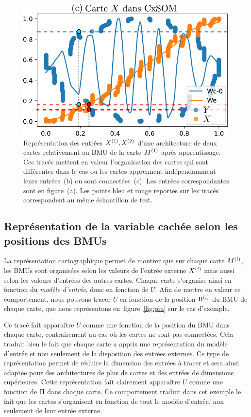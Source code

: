\documentclass[../main]{subfiles}
\begin{document}
\begin{figure}
\begin{minipage}{0.38\textwidth}
\includegraphics[width=\textwidth]{weights_2som.pdf}
\end{minipage}

\caption{Représentation des entrées $X^{({1})},X^{({2})}$ d'une architecture de deux cartes relativement au BMU de la carte $M^{({1})}$ après apprentissage. Ces tracés mettent en valeur l'organisation des cartes qui sont différentes dans le cas ou les cartes apprennent indépendamment leurs entrées~(b) ou sont connectées~(c). Les entrées correspondantes sont en figure~(a). Les points bleu et rouge reportés sur les tracés correspondent au même échantillon de test.\label{fig:inputs}}
\end{figure}

\subsection{Représentation de la variable cachée selon les positions des BMUs}

La représentation cartographique permet de montrer que sur chaque carte $M^{({i})}$, les BMUs sont organisées selon les valeurs de l'entrée externe $X^{({i})}$ mais aussi selon les valeurs d'entrées des autres cartes. Chaque carte s'organise ainsi en fonction du \emph{modèle d'entrée}, donc en fonction de $U$.
Afin de mettre en valeur ce comportement, nous pouvons tracer $U$ en fonction de la position $\Pi^{({i})}$ du BMU de chaque carte, que nous représentons en~figure~\ref{fig:piu} sur le cas d'exemple.

Ce tracé fait apparaître $U$ comme une fonction de la position du BMU dans chaque carte, contrairement au cas où les cartes ne sont pas connectées. 
Cela traduit bien le fait que chaque carte a appris une représentation du modèle d'entrée et non seulement de la disposition des entrées externes.
Ce type de représentation permet de réduire la dimension des entrées à tracer et sera ainsi adaptée pour des architectures de plus de cartes et des entrées de dimensions supérieures.
Cette représentation fait clairement apparaître $U$ comme une fonction de $\Pi$ dans chaque carte. Ce comportement traduit dans cet exemple le fait que les cartes s'organisent en fonction de tout le modèle d'entrée, non seulement de leur entrée externe.
\end{document}
